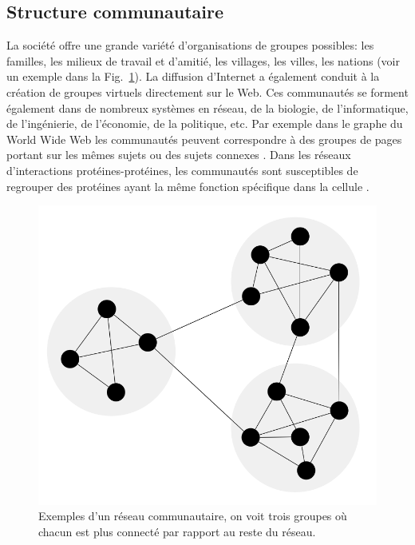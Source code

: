 \subsection{Structure communautaire}
La société offre une grande variété d'organisations de groupes possibles: les familles, les milieux de travail et d'amitié, les villages, les villes, les nations (voir un exemple dans la Fig.~\ref{community-network}). La diffusion d'Internet a également conduit à la création de groupes virtuels directement sur le Web. Ces communautés se forment également dans de nombreux systèmes en réseau, de la biologie, de l'informatique, de l'ingénierie, de l'économie, de la politique, etc. Par exemple dans le graphe du World Wide Web les communautés peuvent correspondre à des groupes de pages portant sur les mêmes sujets ou des sujets connexes \cite{Dou-al2007,Flak-al2002}. Dans les réseaux d'interactions protéines-protéines, les communautés sont susceptibles de regrouper des protéines ayant la même fonction spécifique dans la cellule \cite{ChY2006,RivT2003}.\\

\begin{figure}[h!]
	\centering
	\includegraphics[scale=0.25]{./figures/Network-Community-structure2}
	\caption{Exemples d'un réseau communautaire, on voit trois groupes où chacun est plus connecté par rapport au reste du réseau.}
	\label{community-network}
\end{figure}

